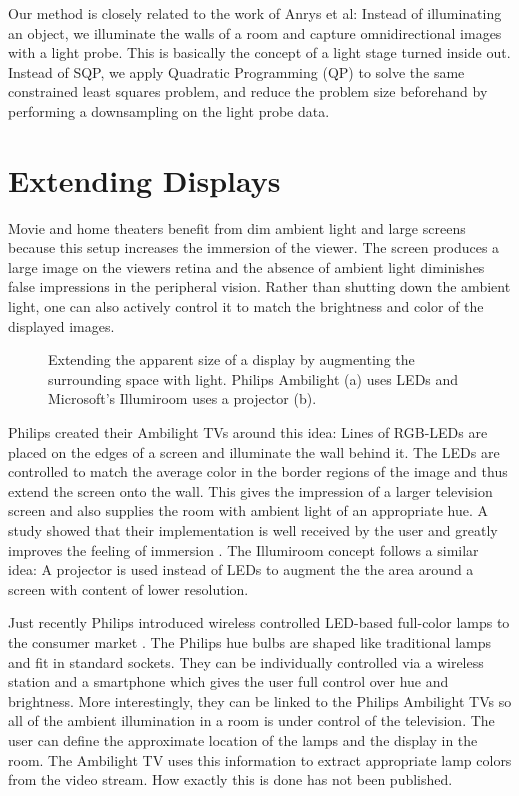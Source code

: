  Our method is closely related to the work of Anrys et al: 
 Instead of illuminating an object, we illuminate the walls of a room and capture omnidirectional images with a light probe.
 This is basically the concept of a light stage turned inside out.
 Instead of SQP, we apply Quadratic Programming (QP) to solve the same constrained least squares problem,
 and reduce the problem size beforehand by performing a downsampling on the light probe data. 

\section{Extending Displays}
    
 Movie and home theaters benefit from dim ambient light and large screens because this setup increases the immersion of the viewer. 
 The screen produces a large image on the viewers retina and the absence of ambient light diminishes false impressions in the peripheral vision.
 Rather than shutting down the ambient light, one can also actively control it to match the brightness and color of the displayed images. 
 
 
 \begin{figure}[H]
  \hfill
  \caption[Ambilight and Illumiroom]{Extending the apparent size of a display by augmenting the surrounding space with light. Philips Ambilight (a) uses LEDs and Microsoft's Illumiroom uses a projector (b).}
 \end{figure}
  
 
 Philips created their Ambilight TVs around this idea: Lines of RGB-LEDs are placed on the edges of a screen and illuminate the wall behind it. 
 The LEDs are controlled to match the average color in the border regions of the image and thus extend the screen onto the wall.
 This gives the impression of a larger television screen and also supplies the room with ambient light of an appropriate hue.
 A study showed that their implementation is well received by the user and greatly improves the feeling of immersion \cite{ambistudy}.
 The Illumiroom concept \cite{jones2013illumiroom} follows a similar idea: A projector is used instead of LEDs to augment the the area around a screen with content of lower resolution.
 
 Just recently Philips introduced wireless controlled LED-based full-color lamps to the consumer market \cite{HUE}. 
 The Philips hue bulbs are shaped like traditional lamps and fit in standard sockets. 
 They can be individually controlled via a wireless station and a smartphone which gives the user full control over hue and brightness.
 More interestingly, they can be linked to the Philips Ambilight TVs so all of the ambient illumination in a room is under control of the television.
 The user can define the approximate location of the lamps and the display in the room.
 The Ambilight TV uses this information to extract appropriate lamp colors from the video stream.
 How exactly this is done has not been published.
 

